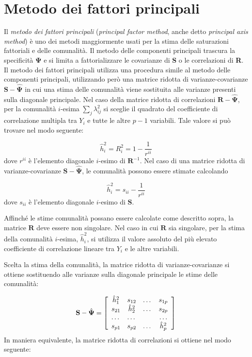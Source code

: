 \section{Metodo dei fattori principali}

Il \textit{metodo dei fattori principali} (\textit{principal factor method}, anche detto \textit{principal axis method}) è uno dei metodi maggiormente usati per la stima delle saturazioni fattoriali e delle comunalità.  
Il metodo delle componenti principali trascura la specificità  $\boldsymbol{\Psi}$  e  si limita a fattorializzare le covarianze di \textbf{S} o le correlazioni di  \textbf{R}. 
Il metodo dei fattori principali utilizza una procedura simile
  al metodo delle componenti principali, utilizzando però una
  matrice ridotta di varianze-covarianze $\textbf{S} -
  \hat{\boldsymbol{\Psi}}$ in cui 
  una stima delle
  comunalità viene sostituita alle varianze presenti sulla diagonale principale.
Nel caso della matrice ridotta di correlazioni
    $\textbf{R} - \hat{\boldsymbol{\Psi}}$, per la comunalità
    $i$-esima $\sum_{j}\lambda_{ij}^2$ si sceglie il quadrato del
    coefficiente di correlazione multipla  tra $Y_i$ e tutte le altre
    $p-1$ variabili. 
 Tale valore si può trovare nel modo seguente:
 
\begin{equation}
\hat{h}^2_i=R^2_i=1-\frac{1}{r^{ii}}
\end{equation}
dove $r^{ii}$ è l'elemento diagonale  $i$-esimo di $\textbf{R}^{-1}$.
Nel caso di una matrice ridotta di varianze-covarianze $\textbf{S} - \hat{\boldsymbol{\Psi}}$, le comunalità possono essere stimate calcolando

\begin{equation}
\hat{h}_i^2=s_{ii}-\frac{1}{r^{ii}}
\end{equation}
dove $s_{ii}$  è l'elemento diagonale  $i$-esimo di $\textbf{S}$.

Affinché le stime comunalità possano essere calcolate come
    descritto sopra, la  matrice  $\textbf{R}$ deve essere non
    singolare. 
 Nel caso in cui $\textbf{R}$ sia singolare, per la stima della comunalità $i$-esima, $ \hat{h}^2_i$, si utilizza il valore assoluto del più elevato coefficiente di correlazione lineare tra $Y_i$ e le altre variabili. 
 
Scelta la stima della comunalità, la matrice ridotta di varianze-covarianze  si ottiene sostituendo alle varianze sulla diagonale principale le stime delle comunalità:

\begin{equation}
\textbf{S} - \hat{\boldsymbol{\Psi}} = 
\left[
  \begin{array}{ c c c c }
    \hat{h}^2_1 & s_{12} & \dots & s_{1p} \\
    s_{21} & \hat{h}^2_2 & \dots & s_{2p} \\
    \dots & \dots &           & \dots\\
    s_{p1} &  s_{p2} & \dots & \hat{h}^2_p
  \end{array} 
\right] 
\end{equation}
In maniera equivalente, la matrice ridotta di correlazioni si ottiene nel modo seguente:

